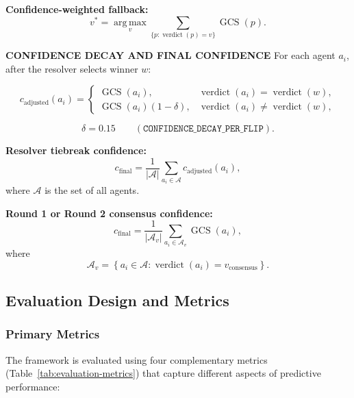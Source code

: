 \documentclass{article}
\begin{document}
\noindent\textbf{Confidence-weighted fallback:}
\[
v^{*}
=
\operatorname*{arg\,max}_{v}
\sum_{\{p:\operatorname{verdict}(p)=v\}}
\operatorname{GCS}(p).
\]


\noindent\textbf{CONFIDENCE DECAY AND FINAL CONFIDENCE}
\noindent
For each agent $a_i$, after the resolver selects winner $w$:

\[
c_{\mathrm{adjusted}}(a_i)
=
\begin{cases}
\operatorname{GCS}(a_i),
& \operatorname{verdict}(a_i)=\operatorname{verdict}(w),\\[0.5em]
\operatorname{GCS}(a_i)(1-\delta),
& \operatorname{verdict}(a_i)\neq\operatorname{verdict}(w),
\end{cases}
\]

\[
\delta=0.15
\qquad
(\texttt{CONFIDENCE\_DECAY\_PER\_FLIP}).
\]

\noindent\textbf{Resolver tiebreak confidence:}
\[
c_{\mathrm{final}}
=
\frac{1}{|\mathcal{A}|}
\sum_{a_i\in\mathcal{A}}
c_{\mathrm{adjusted}}(a_i),
\]
where $\mathcal{A}$ is the set of all agents.

\noindent\textbf{Round 1 or Round 2 consensus confidence:}
\[
c_{\mathrm{final}}
=
\frac{1}{|\mathcal{A}_{v}|}
\sum_{a_i\in\mathcal{A}_{v}}
\operatorname{GCS}(a_i),
\]
where
\[
\mathcal{A}_{v}
=
\left\{
a_i\in\mathcal{A}:
\operatorname{verdict}(a_i)=v_{\mathrm{consensus}}
\right\}.
\]

\subsection{Evaluation Design and Metrics}

\subsubsection{Primary Metrics}
The framework is evaluated using four complementary metrics (Table~\ref{tab:evaluation-metrics}) that capture different aspects of predictive performance:
\end{document}
